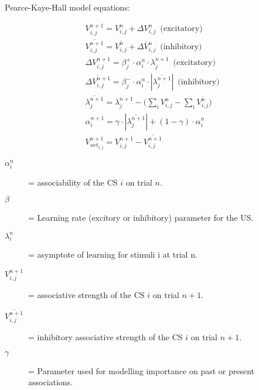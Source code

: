\documentclass[varwidth]{standalone}
\begin{document}
Pearce-Kaye-Hall model equations:


\begin{align}
V_{i,j}^{n+1} = V_{i,j}^n + \Delta V_{i,j}^n \,\,\,\text{(excitatory)} \\
\overline{V_{i,j}^{n+1}} = \overline{V_{i,j}^n} + \overline{\Delta V_{i,j}^n} \,\,\,\text{(inhibitory)} \\
\Delta V_{i,j}^{n+1} = \beta_j^{+} \cdot \alpha_i^n \cdot \lambda_j^{n+1} \,\,\,\text{(excitatory)} \\
\overline{\Delta V_{i,j}^{n+1}} = \beta_j^{-} \cdot \alpha_i^n \cdot \left| \overline{\lambda_j^{n+1}} \right| \,\,\,\text{(inhibitory)} \\
\overline{\lambda_j^{n+1}} = \lambda_j^{n+1} - \Big( \sum_i V_{i,j}^n - \sum_i \overline{V_{i,j}^n} \Big) \\
\alpha^{n+1}_i = \gamma \cdot |\overline{\lambda_j^{n+1}}| + (1-\gamma) \cdot \alpha^{n}_i \\
V_{net_{i,j}}^{n+1} = V_{i,j}^{n+1} - \overline{V_{i,j}^{n+1}}
\end{align}


\begin{description}
	\item[$\alpha_i^{n}$] = associability of the CS $i$ on trial $n$.
        \item[$\beta$] = Learning rate (excitory or inhibitory) parameter for the US.
	\item[$\lambda_i^n$] = asymptote of learning for stimuli i at trial n.
	\item[$V_{i,j}^{n + 1}$] = associative strength of the CS $i$ on trial $n + 1$.
        \item[$\overline{V_{i,j}^{n+1}}$] = inhibitory associative strength of the CS $i$ on trial $n + 1$.
	\item[$\gamma$] = Parameter used for modelling importance on past or present associations.
\end{description} \vspace{10pt}
\end{document}

